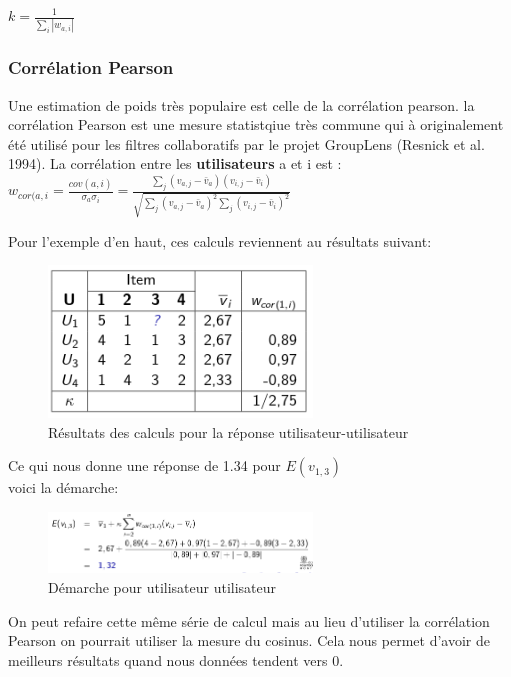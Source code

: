 \documentclass[oneside]{book}
\begin{document}
\centering
$k = \frac{1}{\sum\limits_i |w_{a,i}|}$
\justify

\subsubsection{Corrélation Pearson}
Une estimation de poids très populaire est celle de la corrélation pearson. la corrélation Pearson est une mesure statistqiue très commune qui à originalement été utilisé pour les filtres collaboratifs par le projet GroupLens (Resnick et al. 1994). La corrélation entre les \textbf{utilisateurs} a et i est : \\

\centering
$w_{cor(a,i} = 
\frac{cov(a,i)}
{\sigma_a \sigma_i} =
\frac
{\sum\limits_j (v_{a,j} - \bar{v}_a )( v_{i,j} - \bar{v}_i)}
{\sqrt{\sum\limits_j (v_{a,j} - \bar{v}_a ) ^2 \sum\limits_j ( v_{i,j} - \bar{v}_i)^2}}$
\justify

Pour l'exemple d'en haut, ces calculs reviennent au résultats suivant:

\begin{figure}[!ht]
\centering
\includegraphics[width = 7cm]{resultats_user_user.png}
\caption{Résultats des calculs pour la réponse utilisateur-utilisateur}
\label{fig:rep_user_user}
\end{figure}
Ce qui nous donne une réponse de 1.34 pour $E(v_{1,3})$\\

voici la démarche:\\

\begin{figure}[!ht]
\centering
\includegraphics[width=7cm]{demarche_user_user.png}
\caption{Démarche pour utilisateur utilisateur}
\label{fig:demarche_user_user}
\end{figure}

On peut refaire cette même série de calcul mais au lieu d'utiliser la corrélation Pearson on pourrait utiliser la mesure du cosinus. Cela nous permet d'avoir de meilleurs résultats quand nous données tendent vers 0.\\
\end{document}
